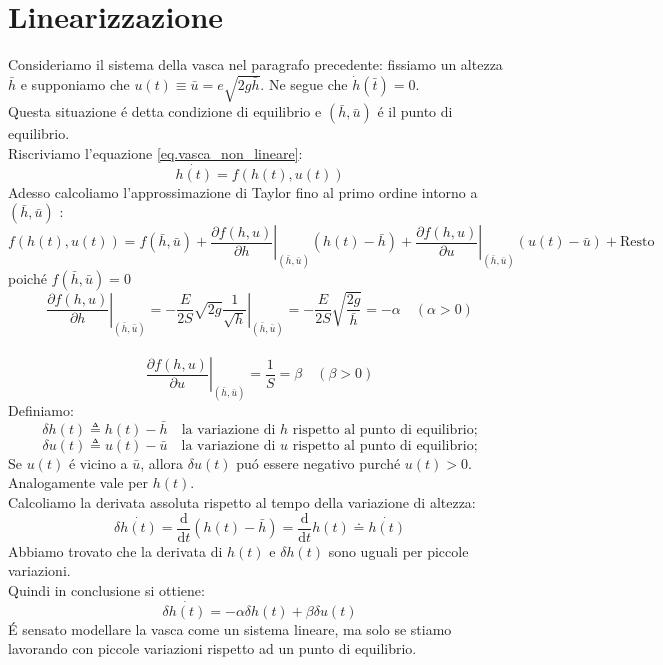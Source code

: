 \documentclass[../main.tex]{subfiles}
\begin{document}
	\section{Linearizzazione}
		Consideriamo il sistema della vasca nel paragrafo precedente: fissiamo un altezza $ \bar{h} $ e supponiamo che $u(t) \equiv \bar{u} = e \sqrt{2g \bar{h}}$. Ne segue che $ \dot{h}(\bar{t}) =0 $.\\
		Questa situazione \'e detta condizione di equilibrio e $( \bar{h} , \bar{u}) $ \'e il punto di equilibrio.\\
		Riscriviamo l'equazione \ref{eq.vasca_non_lineare}:
		\[ \dot{h(t)} = f(h(t),u(t)) \]
		Adesso calcoliamo l'approssimazione di Taylor fino al primo ordine intorno a \( (\bar{h},\bar{u}) \) :
		\[
			f(h(t),u(t)) = f(\bar{h},\bar{u}) + \left. \frac{\partial f(h,u)}{\partial h} \right|_{(\bar{h},\bar{u})} (h(t) - \bar{h}) + \left. \frac{\partial f(h,u)}{\partial u} \right|_{(\bar{h},\bar{u})} (u(t) - \bar{u}) + \mbox{Resto}
		\]
		poich\'e $ f(\bar{h},\bar{u}) =0$\\
		\[
			\left. \frac{\partial f(h,u)}{\partial h} \right|_{(\bar{h},\bar{u})} = - \frac{E}{2S} \sqrt{2g} \left. \frac{1}{\sqrt{h}} \right|_{(\bar{h},\bar{u})} = - \frac{E}{2S} \sqrt{\frac{2g}{\bar{h}}} = - \alpha \quad (\alpha > 0)\]
			\\
		\[
			\left. \frac{\partial f(h,u)}{\partial u} \right|_{(\bar{h},\bar{u})} = \frac{1}{S} = \beta \quad (\beta > 0)  
		\]
		Definiamo:
		\[ \delta h(t) \triangleq h(t)- \bar{h} \quad \text{la variazione di $h$ rispetto al punto di equilibrio;} \]
		\[ \delta u(t) \triangleq u(t)- \bar{u} \quad \text{la variazione di $u$ rispetto al punto di equilibrio;} \]
		Se $u(t)$ \'e vicino a $\bar{u}$, allora $\delta u(t)$ pu\'o essere negativo purch\'e $u(t)>0$. Analogamente vale per $h(t)$.\\
		Calcoliamo la derivata assoluta rispetto al tempo della variazione di altezza:
		\[ \delta \dot{h(t)} = \frac{\mathrm{d}}{\mathrm{d} t}(h(t)-\bar{h}) = \frac{\mathrm{d}}{\mathrm{d} t}h(t) \doteq \dot{h(t)} \] 
		Abbiamo trovato che la derivata di $h(t)$ e $\delta h(t)$ sono uguali per piccole variazioni.\\
		Quindi in conclusione si ottiene:
		\begin{equation}
			\delta \dot{h(t)} = -\alpha \delta h(t) + \beta \delta u(t)
		\end{equation}
		\'E sensato modellare la vasca come un sistema lineare, ma solo se stiamo lavorando con piccole variazioni rispetto ad un punto di equilibrio.
\end{document}
